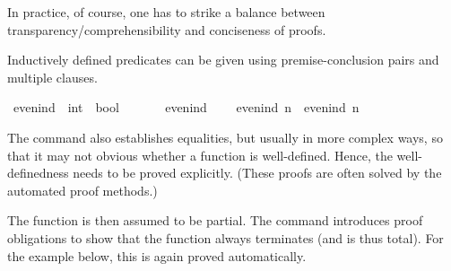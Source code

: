 \begin{isabellebody}
%
\isadelimvisible
%
\endisadelimvisible
%
\begin{isamarkuptext}%
In practice, of course, one has to strike a balance between transparency/comprehensibility and conciseness of proofs.%
\end{isamarkuptext}\isamarkuptrue%
%
\isadelimdocument
%
\endisadelimdocument
%
\isatagdocument
%
\isamarkuptrue%
%
\endisatagdocument
{\isafolddocument}%
%
\isadelimdocument
%
\endisadelimdocument
%
\begin{isamarkuptext}%
Inductively defined predicates can be given using premise-conclusion pairs and multiple clauses.%
\end{isamarkuptext}\isamarkuptrue%
\isamarkupfalse%
\ even{\isacharunderscore}{\kern0pt}ind\ {\isacharcolon}{\kern0pt}{\isacharcolon}{\kern0pt}\ {\isacartoucheopen}int\ {\isasymRightarrow}\ bool{\isacartoucheclose}\isanewline
\ \ \isanewline
\ \ \ \ {\isacartoucheopen}even{\isacharunderscore}{\kern0pt}ind\ {}{\isacartoucheclose}\isanewline
\ \ {\isacharbar}{\kern0pt}\ {\isacartoucheopen}even{\isacharunderscore}{\kern0pt}ind\ n\ {\isasymLongrightarrow}\ even{\isacharunderscore}{\kern0pt}ind\ {\isacharparenleft}{\kern0pt}n{\isacharplus}{\kern0pt}{}{\isacharparenright}{\kern0pt}{\isacartoucheclose}%
\isadelimdocument
%
\endisadelimdocument
%
\isatagdocument
%
\isamarkuptrue%
%
\endisatagdocument
{\isafolddocument}%
%
\isadelimdocument
%
\endisadelimdocument
%
\begin{isamarkuptext}%
The command  also establishes equalities, but usually in more complex ways, so that it may not obvious whether a function is well-defined. Hence, the well-definedness needs to be proved explicitly. (These proofs are often solved by the automated proof methods.)

The function is then assumed to be partial. The command  introduces proof obligations to show that the function always terminates (and is thus total). For the example below, this is again proved automatically.


\end{isamarkuptext}
\end{isabellebody}
